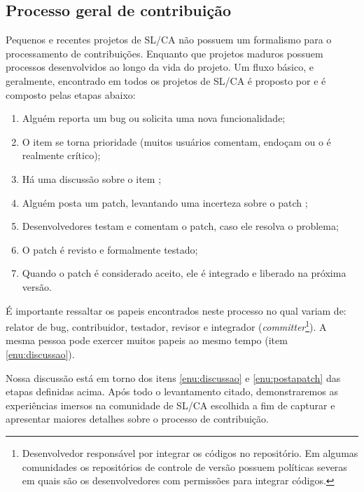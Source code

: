 \subsection{Processo geral de contribuição}

Pequenos e recentes projetos de SL/CA não possuem um formalismo para o processamento de contribuições. Enquanto que projetos maduros possuem processos desenvolvidos ao longo da vida do projeto. Um fluxo básico, e geralmente, encontrado em todos os projetos de SL/CA é proposto por \cite{preliminary} e é composto pelas etapas abaixo:

\begin{enumerate}
 \item Alguém reporta um bug ou solicita uma nova funcionalidade;
 \item O item se torna prioridade (muitos usuários comentam, endoçam ou o é realmente crítico);
 \item Há uma discussão sobre o item \label{enu:discussao};
 \item Alguém posta um patch, levantando uma incerteza sobre o patch \label{enu:postapatch};
 \item Desenvolvedores testam e comentam o patch, caso ele resolva o problema;
 \item O patch é revisto e formalmente testado;
 \item Quando o patch é considerado aceito, ele é integrado e liberado na próxima versão.
\end{enumerate}

É importante ressaltar os papeis encontrados neste processo no qual variam de: relator de bug, contribuidor, testador, revisor e integrador (\textit{committer}\footnote{Desenvolvedor responsável por integrar os códigos no repositório. Em algumas comunidades os repositórios de controle de versão possuem políticas severas em quais são os desenvolvedores com permissões para integrar códigos.}). A mesma pessoa pode exercer muitos papeis ao mesmo tempo (item \ref{enu:discussao}).

Nossa discussão está em torno dos itens \ref{enu:discussao} e \ref{enu:postapatch} das etapas definidas acima. Após todo o levantamento citado, demonstraremos as experiências imersos na comunidade de SL/CA escolhida a fim de capturar e apresentar maiores detalhes sobre o processo de contribuição.

% 
% 
% 
% 
% 




